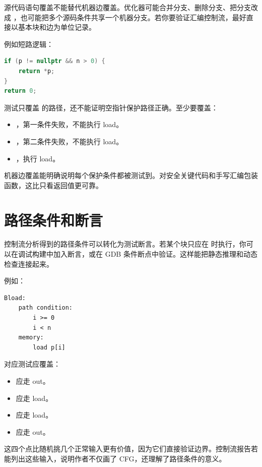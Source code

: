 源代码语句覆盖不能替代机器边覆盖。优化器可能合并分支、删除分支、把分支改成 ，也可能把多个源码条件共享一个机器分支。若你要验证汇编控制流，最好直接以基本块和边为单位记录。

例如短路逻辑：

\begin{lstlisting}[language=C++]
if (p != nullptr && n > 0) {
    return *p;
}
return 0;
\end{lstlisting}

测试只覆盖  的路径，还不能证明空指针保护路径正确。至少要覆盖：

\begin{itemize}
  \item {}，第一条件失败，不能执行 load。
  \item {}，第二条件失败，不能执行 load。
  \item {}，执行 load。
\end{itemize}

机器边覆盖能明确说明每个保护条件都被测试到。对安全关键代码和手写汇编包装函数，这比只看返回值更可靠。

\section{路径条件和断言}

控制流分析得到的路径条件可以转化为测试断言。若某个块只应在  时执行，你可以在调试构建中加入断言，或在 GDB 条件断点中验证。这样能把静态推理和动态检查连接起来。

例如：

\begin{lstlisting}
Bload:
    path condition:
        i >= 0
        i < n
    memory:
        load p[i]
\end{lstlisting}

对应测试应覆盖：

\begin{itemize}
  \item {} 应走 out。
  \item {} 应走 load。
  \item {} 应走 load。
  \item {} 应走 out。
\end{itemize}

这四个点比随机挑几个正常输入更有价值，因为它们直接验证边界。控制流报告若能列出这些输入，说明作者不仅画了 CFG，还理解了路径条件的意义。

